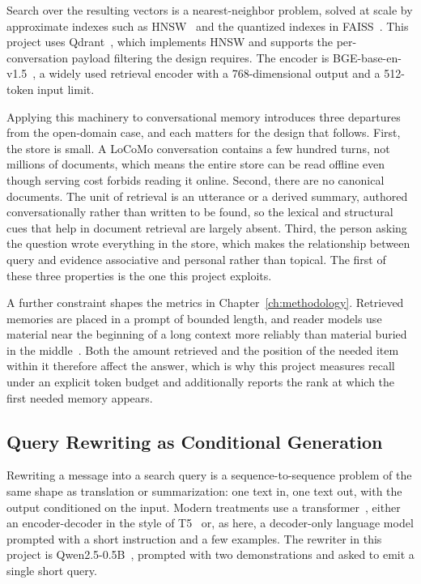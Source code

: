 \documentclass[12pt,letterpaper,oneside]{report}
\begin{document}
Search over the resulting vectors is a nearest-neighbor problem, solved at
scale by approximate indexes such as HNSW~\cite{hnsw} and the quantized indexes
in FAISS~\cite{faiss}. This project uses Qdrant~\cite{qdrant}, which
implements HNSW and supports the per-conversation payload filtering the design
requires. The encoder is BGE-base-en-v1.5~\cite{bge}, a widely used retrieval
encoder with a 768-dimensional output and a 512-token input limit.

Applying this machinery to conversational memory introduces three departures
from the open-domain case, and each matters for the design that follows. First,
the store is small. A LoCoMo conversation contains a few hundred turns, not
millions of documents, which means the entire store can be read offline even
though serving cost forbids reading it online. Second, there are no canonical
documents. The unit of retrieval is an utterance or a derived summary, authored
conversationally rather than written to be found, so the lexical and structural
cues that help in document retrieval are largely absent. Third, the person
asking the question wrote everything in the store, which makes the relationship
between query and evidence associative and personal rather than topical. The
first of these three properties is the one this project exploits.

A further constraint shapes the metrics in Chapter~\ref{ch:methodology}.
Retrieved memories are placed in a prompt of bounded length, and reader models
use material near the beginning of a long context more reliably than material
buried in the middle~\cite{lostmiddle}. Both the amount retrieved and the
position of the needed item within it therefore affect the answer, which is why
this project measures recall under an explicit token budget and additionally
reports the rank at which the first needed memory appears.

\subsection{Query Rewriting as Conditional Generation}
\label{sec:concept-rewriting}

Rewriting a message into a search query is a sequence-to-sequence problem of
the same shape as translation or summarization: one text in, one text out, with
the output conditioned on the input. Modern treatments use a
transformer~\cite{transformer}, either an encoder-decoder in the style of
T5~\cite{t5} or, as here, a decoder-only language model prompted with a short
instruction and a few examples. The rewriter in this project is
Qwen2.5-0.5B~\cite{qwen}, prompted with two demonstrations and asked to emit a
single short query.
\end{document}
